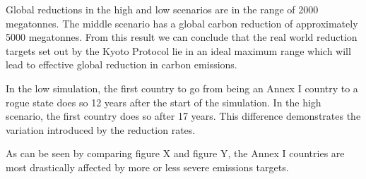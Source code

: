 Global reductions in the high and low scenarios are in the range of 2000 megatonnes. The middle scenario has a global carbon reduction of approximately 5000 megatonnes. From this result we can conclude that the real world reduction targets set out by the Kyoto Protocol lie in an ideal maximum range which will lead to effective global reduction in carbon emissions.

In the low simulation, the first country to go from being an Annex I country to a rogue state does so 12 years after the start of the simulation. In the high scenario, the first country does so after 17 years. This difference demonstrates the variation introduced by the reduction rates.

As can be seen by comparing figure X and figure Y, the Annex I countries are most drastically affected by more or less severe emissions targets.
